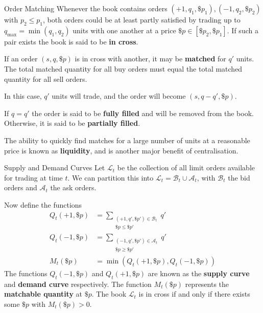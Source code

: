 \documentclass{beamer}
\begin{document}
\begin{frame}{Order Matching}
	Whenever the book contains orders $(+1,q_1,\$p_1), (-1,q_2,\$p_2)$ with $p_2\leq p_1$, both orders could be at least partly satisfied by trading up to $q_{\max}=\min(q_1,q_2)$ units with one another at a price $\$p\in[\$p_2,\$p_1]$. If such a pair exists the book is said to be \textbf{in cross}.

	\pause

	If an order $(s,q,\$p)$ is in cross with another, it may be \textbf{matched} for $q'$ units. The total matched quantity for all buy orders must equal the total matched quantity for all sell orders.

	\pause

	In this case, $q'$ units will trade, and the order will become $(s,q-q',\$p)$.

	\pause

	If $q=q'$ the order is said to be \textbf{fully filled} and will be removed from the book. Otherwise, it is said to be \textbf{partially filled}.

	\pause
	The ability to quickly find matches for a large number of units at a reasonable price is known as \textbf{liquidity}, and is another major benefit of centralisation.
\end{frame}

\begin{frame}{Supply and Demand Curves}
	Let $\mathcal{L}_t$ be the collection of all limit orders available for trading at time $t$. We can partition this into $\mathcal{L}_t = \mathcal{B}_t\cup\mathcal{A}_t$, with $\mathcal{B}_t$ the bid orders and $\mathcal{A}_t$ the ask orders.

	\pause

	Now define the functions
	\begin{align*}
		Q_t(+1,\$p)	&= \sum_{\substack{(+1,q',\$p') \in \mathcal{B}_t \\ \$p\leq \$p'}} q'
	\\	Q_t(-1,\$p)	&= \sum_{\substack{(-1,q',\$p') \in \mathcal{A}_t \\ \$p\geq \$p'}} q'
	\\	M_t(\$p)	&= \min(Q_t(+1,\$p),Q_t(-1,\$p))
	\end{align*}
	\pause
	The functions $Q_t(-1,\$p)$ and $Q_t(+1,\$p)$ are known as the \textbf{supply curve} and \textbf{demand curve} respectively. The function $M_t(\$p)$ represents the \textbf{matchable quantity} at $\$p$.
	\pause
	The book $\mathcal{L}_t$ is in cross if and only if there exists some $\$p$ with $M_t(\$p)>0$.
\end{frame}
\end{document}
